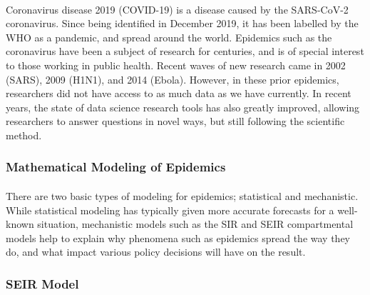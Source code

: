 \documentclass[12pt, a4, epsf] {article}
\theoremstyle{plain}
\theoremstyle{definition}
\begin{document}
\paragraph{}
Coronavirus disease 2019 (COVID-19) is a disease caused by the SARS-CoV-2 coronavirus. Since being identified in December 2019, it has been labelled by the WHO as a pandemic, and spread around the world. Epidemics such as the coronavirus have been a subject of research for centuries, and is of special interest to those working in public health. Recent waves of new research came in 2002 (SARS), 2009 (H1N1), and 2014 (Ebola). However, in these prior epidemics, researchers did not have access to as much data as we have currently. In recent years, the state of data science research tools has also greatly improved, allowing researchers to answer questions in novel ways, but still following the scientific method.

\subsubsection{Mathematical Modeling of Epidemics}
\paragraph{}
There are two basic types of modeling for epidemics; statistical and mechanistic. While statistical modeling has typically given more accurate forecasts for a well-known situation, mechanistic models such as the SIR and SEIR compartmental models help to explain why phenomena such as epidemics spread the way they do, and what impact various policy decisions will have on the result.
\subsubsection{SEIR Model}
\end{document}

